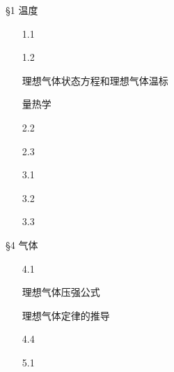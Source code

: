\documentclass[CJK]{beamer}
\begin{document}
\begin{frame}
\bch
\S{1}  温度
\begin{itemize}
\item[1.1]{}
\item[1.2]{}
\item[\blacktext{1.3}]{理想气体状态方程和理想气体温标}
\item[\greentext{1.4}]{}
\end{itemize}
\begin{itemize}
\item[\blacktext{2.1}]{量热学 }
\item[2.2]{}
\item[2.3]{}
\end{itemize}

\begin{itemize}
\item[3.1]{}
\item[3.2]{}
\item[3.3]{}
\end{itemize}

\ech
\end{frame}

\begin{frame}
\bch

\S{4} 气体
\begin{itemize}
\item[4.1]{}
\item[\blacktext{4.2}]{理想气体压强公式}
\item[\blacktext{4.3}]{理想气体定律的推导}
\item[4.4]{}
\end{itemize}

\begin{itemize}
\item[5.1]{}
\item[\cyantext{5.2}]{}
\item[\greentext{5.3}]{}
\end{itemize}
\ech
\end{frame}
\end{document}
